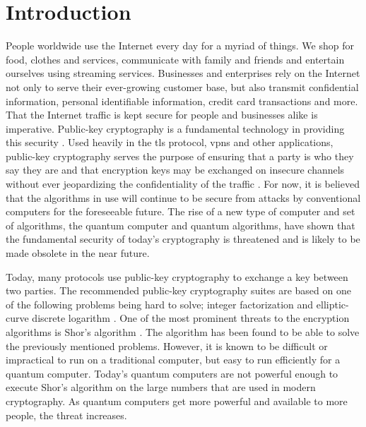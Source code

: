 \chapter{Introduction}
\label{chapter:introduction}




People worldwide use the Internet every day for a myriad of things. We shop for food, clothes and services, communicate with family and friends and entertain ourselves using streaming services. Businesses and enterprises rely on the Internet not only to serve their ever-growing customer base, but also transmit confidential information, personal identifiable information, credit card transactions and more. That the Internet traffic is kept secure for people and businesses alike is imperative. Public-key cryptography is a fundamental technology in providing this security \cite{rfc8446}. Used heavily in the \gls{tls} protocol, \glspl{vpn} and other applications, public-key cryptography serves the purpose of ensuring that a party is who they say they are and that encryption keys may be exchanged on insecure channels without ever jeopardizing the confidentiality of the traffic \cite{rfc8446}. For now, it is believed that the algorithms in use will continue to be secure from attacks by conventional computers for the foreseeable future. The rise of a new type of computer and set of algorithms, the quantum computer and quantum algorithms, have shown that the fundamental security of today's cryptography is threatened and is likely to be made obsolete in the near future.

Today, many protocols use public-key cryptography to exchange a key between two parties. The recommended public-key cryptography suites are based on one of the following problems being hard to solve; integer factorization and elliptic-curve discrete logarithm \cite{nsa2015, nist2019}. One of the most prominent threats to the encryption algorithms is Shor's algorithm \cite{shor1997}. The algorithm has been found to be able to solve the previously mentioned problems. However, it is known to be difficult or impractical to run on a traditional computer, but easy to run efficiently for a quantum computer. Today's quantum computers are not powerful enough to execute Shor's algorithm on the large numbers that are used in modern cryptography. As quantum computers get more powerful and available to more people, the threat increases.

